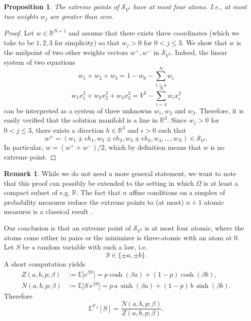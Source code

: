 \documentclass[reqno,11pt]{amsart}
\newcommand{\1}{\mathds{1}}
\theoremstyle{plain}
\newtheorem{proposition}[theorem]{Proposition}
\theoremstyle{definition}
\newtheorem{remark}[theorem]{Remark}
\numberwithin{equation}{section}
\newcommand{\caS}{{\mathcal S}}
\newcommand{\bbP}{{\mathbb P}}
\newcommand{\bbR}{{\mathbb R}}
\begin{document}
\begin{proposition}
    The extreme points of $\caS_{V^2}$ have at most four atoms. I.e., at most two weights $w_j$ are greater than zero.
\end{proposition}

\begin{proof}
    Let $w \in \bbR^{N+1}$ and assume that there exists three coordinates (which we take to be $1,2,3$ for simplicity) so that $w_j > 0$ for $0 < j \le 3$. We show that $w$ is the midpoint of two other weights vectors $w^+,w^-$ in $\caS_{V^2}$. Indeed, the linear system of two equations
    $$ w_1 + w_2 + w_3 = 1 - w_0 -  \sum\limits_{i=4} ^N w_i$$
    $$w_1 x_{1} ^2 + w_2 x_2 ^2 + w_3 x_3 ^2 = V^2 - \sum\limits_{i=4} ^N w_i x_i ^2$$
    can be interpreted as a system of three unknowns $w_1,w_2$ and $w_3$. Therefore, it is easily verified that the solution manifold is a line in $\bbR^3$. Since $w_j > 0$ for $0<j\le 3$, there exists a direction $h \in \bbR^3$ and $\epsilon > 0$ such that
     $$w^{\pm} = (w_1 \pm \epsilon h_1 ,w_2 \pm \epsilon h_2,w _3 \pm \epsilon h_3, w_4,...,w_N) \in \caS_{V^2}.$$
     In particular, $w = (w^+ + w^-)/2$, which by definition means that $w$ is no extreme point.
\end{proof}

\begin{remark}
    While we do not need a more general statement, we want to note that this proof can possibly be extended to the setting in which $\Omega$ is at least a compact subset of e.g. $\bbR$. The fact that $n$ affine conditions on a simplex of probability measures reduce the extreme points to (at most) $n+1$ atomic measures is a classical result \cite{Wi88}.
\end{remark}

Our conclusion is that an extreme point of $\caS_{V^2}$ is at most four atomic, where the atoms come either in pairs or the minimizer is three-atomic with an atom at $0$. Let $S$ be a random variable with such a law, i.e.
\[
    S\in\{\pm a,\pm b\}.
\]
A short computation yields
\begin{align}
    Z(a,b,p;\beta)
    &:= \mathbb{E}\bigl[e^{\beta S}\bigr]
      = p\cosh(\beta a) + (1-p)\cosh(\beta b), \label{eq:Z-four-point}\\
    N(a,b,p;\beta)
    &:= \mathbb{E}\bigl[S\,e^{\beta S}\bigr]
      = p\,a\,\sinh(\beta a)
        + (1-p)\,b\,\sinh(\beta b).\label{eq:N-four-point}
\end{align}
Therefore
\begin{equation}\label{eq:S-tilted-ratio-four-point}
    \mathbb{E}^{\bbP_\beta}[S]
    = \frac{N(a,b,p;\beta)}{Z(a,b,p;\beta)}.
\end{equation}
\end{document}
